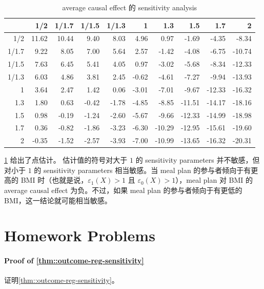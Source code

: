 \begin{table}[ht]
\centering
\caption{average causal effect 的 sensitivity analysis}\label{table::sensitivity-ACE}
\begin{tabular}{rrrrrrrrrr}
  \hline
 & 1/2 & 1/1.7 & 1/1.5 & 1/1.3 & 1 & 1.3 & 1.5 & 1.7 & 2 \\ 
  \hline
1/2 & 11.62 & 10.44 & 9.40 & 8.03 & 4.96 & 0.97 & -1.69 & -4.35 & -8.34 \\ 
  1/1.7 & 9.22 & 8.05 & 7.00 & 5.64 & 2.57 & -1.42 & -4.08 & -6.75 & -10.74 \\ 
  1/1.5 & 7.63 & 6.45 & 5.41 & 4.05 & 0.97 & -3.02 & -5.68 & -8.34 & -12.33 \\ 
  1/1.3 & 6.03 & 4.86 & 3.81 & 2.45 & -0.62 & -4.61 & -7.27 & -9.94 & -13.93 \\ 
  1 & 3.64 & 2.47 & 1.42 & 0.06 & -3.01 & -7.01 & -9.67 & -12.33 & -16.32 \\ 
  1.3 & 1.80 & 0.63 & -0.42 & -1.78 & -4.85 & -8.85 & -11.51 & -14.17 & -18.16 \\ 
  1.5 & 0.98 & -0.19 & -1.24 & -2.60 & -5.67 & -9.66 & -12.33 & -14.99 & -18.98 \\ 
  1.7 & 0.36 & -0.82 & -1.86 & -3.23 & -6.30 & -10.29 & -12.95 & -15.61 & -19.60 \\ 
  2 & -0.35 & -1.52 & -2.57 & -3.93 & -7.00 & -10.99 & -13.65 & -16.32 & -20.31 \\ 
   \hline
\end{tabular}
\end{table}


\cref{table::sensitivity-ACE} 给出了点估计。
估计值的符号对大于 $1$ 的 sensitivity parameters 并不敏感，但对小于 $1$ 的 sensitivity parameters 相当敏感。当 meal plan 的参与者倾向于有更高的 BMI 时（也就是说，$\varepsilon_1(X) >1$ 且 $ \varepsilon_0(X)  > 1$），meal plan 对 BMI 的 average causal effect 为负。不过，如果 meal plan 的参与者倾向于有更低的 BMI，这一结论就可能相当敏感。



\section{Homework Problems}


\paragraph{Proof of \cref{thm::outcome-reg-sensitivity}}\label{hw::proof-theorem-1-sa}

证明\cref{thm::outcome-reg-sensitivity}。


